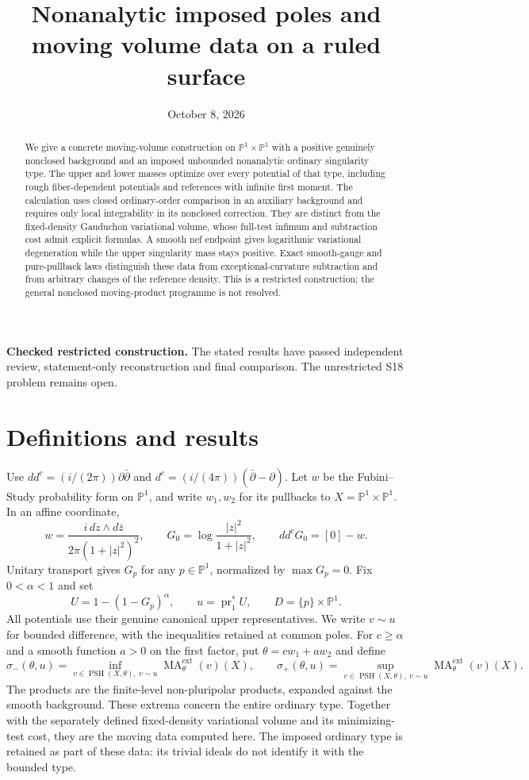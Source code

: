 \documentclass[11pt]{article}
\title{Nonanalytic imposed poles and moving volume data on a ruled surface}
\author{}
\date{October 8, 2026}
\newcommand{\ddc}{dd^c}
\newcommand{\PSH}{\operatorname{PSH}}
\newcommand{\MA}{\operatorname{MA}}
\newcommand{\ext}{\mathrm{ext}}
\newcommand{\PP}{\mathbb P}
\begin{document}
\maketitle
\noindent\textbf{Checked restricted construction.} The stated results have
passed independent review, statement-only reconstruction and final comparison.
The unrestricted S18 problem remains open.

\begin{abstract}
We give a concrete moving-volume construction on $\PP^1\times\PP^1$
with a positive genuinely nonclosed background and an imposed unbounded
nonanalytic ordinary singularity type. The upper and lower masses optimize
over every potential of that type, including rough fiber-dependent potentials
and references with infinite first moment. The calculation uses closed
ordinary-order comparison in an auxiliary background and requires only
local integrability in its nonclosed correction.
They are distinct from the fixed-density Gauduchon variational volume, whose
full-test infimum and subtraction cost admit explicit formulas. A smooth nef
endpoint gives logarithmic variational degeneration while the upper singularity
mass stays positive. Exact smooth-gauge and pure-pullback laws distinguish
these data from exceptional-curvature subtraction and from arbitrary changes
of the reference density. This is a restricted construction; the general
nonclosed moving-product programme is not resolved.
\end{abstract}

\section{Definitions and results}
Use $\ddc=(i/(2\pi))\partial\bar\partial$ and
$d^c=(i/(4\pi))(\bar\partial-\partial)$. Let $w$ be the Fubini--Study
probability form on $\PP^1$, and write $w_1,w_2$ for its pullbacks to
$X=\PP^1\times\PP^1$. In an affine coordinate,
\[
 w=\frac{i\,dz\wedge d\bar z}{2\pi(1+|z|^2)^2},\qquad
 G_0=\log\frac{|z|^2}{1+|z|^2},\qquad \ddc G_0=[0]-w.
\]
Unitary transport gives $G_p$ for any $p\in\PP^1$, normalized by
$\max G_p=0$. Fix $0<\alpha<1$ and set
\[
 U=1-(1-G_p)^\alpha,\qquad u=\operatorname{pr}_1^*U,
 \qquad D=\{p\}\times\PP^1.
\]
All potentials use their genuine canonical upper representatives. We write
$v\sim u$ for bounded difference, with the inequalities retained at common
poles. For $c\geq\alpha$ and a smooth function $a>0$ on the first factor,
put $\theta=cw_1+aw_2$ and define
\[
 \sigma_-(\theta,u)=\inf_{v\in\PSH(X,\theta),\ v\sim u}
              \MA^{\ext}_\theta(v)(X),\qquad
 \sigma_+(\theta,u)=\sup_{v\in\PSH(X,\theta),\ v\sim u}
              \MA^{\ext}_\theta(v)(X).
\]
The products are the finite-level non-pluripolar products, expanded against
the smooth background. These extrema concern the entire ordinary type. Together with the separately
defined fixed-density variational volume and its minimizing-test cost, they
are the moving data computed here. The imposed ordinary type is retained
as part of these data: its trivial ideals do not identify it with the
bounded type.
\end{document}
